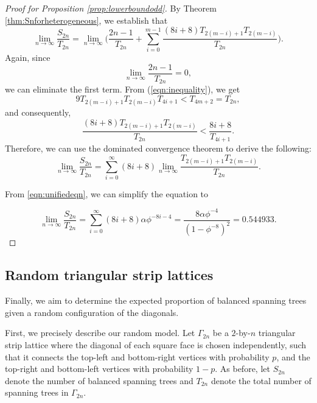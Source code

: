 \documentclass{amsart}
\theoremstyle{definition}
\newcommand{\yandi}[1]{\marginpar{\tiny \color{red} Yandi: #1}}
\newcommand{\saugat}[1]{\marginpar{\tiny \color{blue} Saugat: #1}}
\newcommand{\longnguyen}[1]
{\marginpar{\tiny \color{purple} Long: #1}}
\begin{document}
\begin{proof}[Proof for Proposition \ref{prop:lowerboundodd}]
By Theorem \ref{thm:Snforheterogeneous}, we establish that
\[\lim_{n \to \infty} \dfrac{S_{2n}}{T_{2n}}=\lim_{n \to \infty}\bigg(\dfrac{2n-1}{T_{2n}}+\sum_{i=0}^{m-1}\dfrac{(8i+8)T_{2(m-i)+1}T_{2(m-i)}}{T_{2n}}\bigg).\]
Again, since 
\[\lim_{n \to \infty}\dfrac{2n-1}{T_{2n}}=0,\]
we can eliminate the first term. From (\ref{eqn:inequality}), we get
\[9T_{2(m-i)+1}T_{2(m-i)}T_{4i+1} < T_{4m+2}=T_{2n},\] and consequently,
\[\dfrac{(8i+8)T_{2(m-i)+1}T_{2(m-i)}}{T_{2n}} < \dfrac{8i+8}{T_{4i+1}}.\]
Therefore, we can use the dominated convergence theorem to derive the following:
\[\lim_{n \to \infty} \dfrac{S_{2n}}{T_{2n}}=\sum_{i=0}^{\infty}(8i+8)\lim_{n \to \infty}\dfrac{T_{2(m-i)+1}T_{2(m-i)}}{T_{2n}}.\]

From \ref{eqn:unifiedeqn}, we can simplify the equation to

\begin{equation}\label{eqn:oddfinal}
    \lim_{n \to \infty} \dfrac{S_{2n}}{T_{2n}}=\sum_{i=0}^{\infty}(8i+8)\alpha \phi^{-8i-4}=\dfrac{8\alpha \phi^{-4}}{(1-\phi^{-8})^2}=0.544933.
\end{equation}

\end{proof}


\subsection{Random triangular strip lattices} Finally, we aim to determine the expected proportion of balanced spanning trees given a random configuration of the diagonals. 

First, we precisely describe our random model. Let $\Gamma_{2n}$ be a $2$-by-$n$ triangular strip lattice where the diagonal of each square face is chosen independently, such that it connects the top-left and bottom-right vertices with probability $p$, and the top-right and bottom-left vertices with probability $1-p$. As before, let $S_{2n}$ denote the number of balanced spanning trees and $T_{2n}$ denote the total number of spanning trees in $\Gamma_{2n}$.
\end{document}
